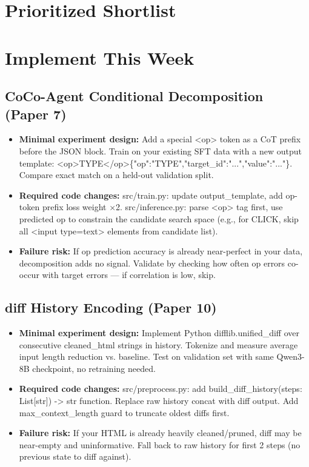 \documentclass[pdflatex,sn-mathphys-num]{sn-jnl}
\theoremstyle{thmstyleone}
\theoremstyle{thmstyletwo}
\theoremstyle{thmstylethree}
\begin{document}
\section{Prioritized Shortlist}

\section{Implement This Week}

\subsection{CoCo-Agent Conditional Decomposition (Paper 7)}
\begin{itemize}
\item \textbf{Minimal experiment design:} Add a special <op> token as a CoT prefix before the JSON block. Train on your existing SFT data with a new output template: <op>TYPE</op>\{"op":"TYPE","target\_id":"...","value":"..."\}. Compare exact match on a held-out validation split.
\item \textbf{Required code changes:} src/train.py: update output\_template, add op-token prefix loss weight $\times$2. src/inference.py: parse <op> tag first, use predicted op to constrain the candidate search space (e.g., for CLICK, skip all <input type=text> elements from candidate list).
\item \textbf{Failure risk:} If op prediction accuracy is already near-perfect in your data, decomposition adds no signal. Validate by checking how often op errors co-occur with target errors --- if correlation is low, skip.
\end{itemize}

\subsection{diff History Encoding (Paper 10)}
\begin{itemize}
\item \textbf{Minimal experiment design:} Implement Python difflib.unified\_diff over consecutive cleaned\_html strings in history. Tokenize and measure average input length reduction vs. baseline. Test on validation set with same Qwen3-8B checkpoint, no retraining needed.
\item \textbf{Required code changes:} src/preprocess.py: add build\_diff\_history(steps: List[str]) -> str function. Replace raw history concat with diff output. Add max\_context\_length guard to truncate oldest diffs first.
\item \textbf{Failure risk:} If your HTML is already heavily cleaned/pruned, diff may be near-empty and uninformative. Fall back to raw history for first 2 steps (no previous state to diff against).
\end{itemize}
\end{document}
